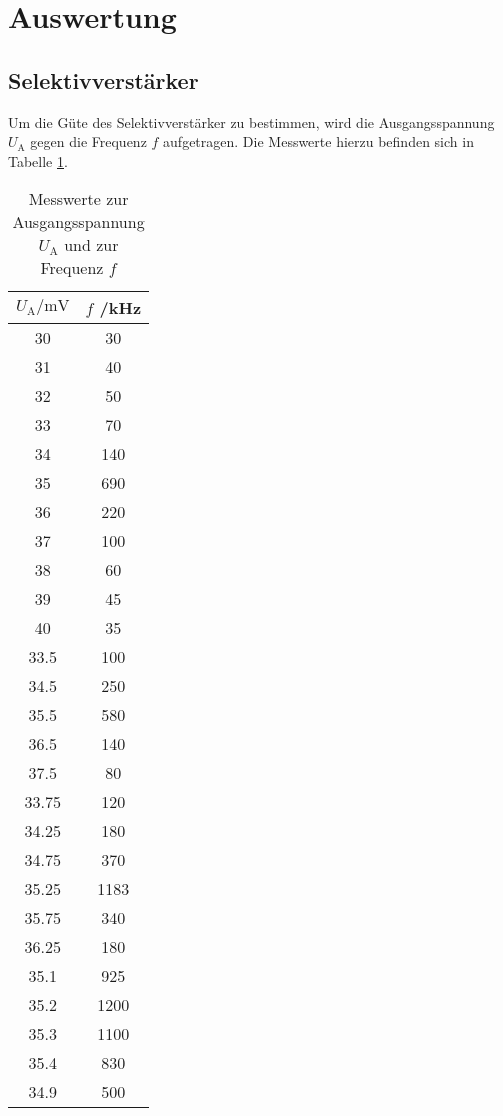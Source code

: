 \section{Auswertung}
\label{sec:Auswertung}

\subsection{Selektivverstärker}
Um die Güte des Selektivverstärker zu bestimmen, wird die Ausgangsspannung $U_\mathrm{A}$ gegen die Frequenz $f$ aufgetragen. Die Messwerte hierzu befinden sich in Tabelle \ref{tab:verstaerker}.

\begin{table}
  \caption{Messwerte zur Ausgangsspannung $U_\mathrm{A}$ und zur Frequenz $f$}
  \centering
  \label{tab:verstaerker}
  \begin{tabular}{c c }
    \toprule
   $U_\mathrm{A}/\si{\milli\volt}$&  $f$ /\si{\kilo\Hz}\\
    \midrule
    30 & 30 \\
    31 & 40\\
    32 & 50\\
    33 & 70\\
    34 & 140\\
    35 & 690\\
    36 & 220\\
    37 & 100\\
    38 & 60\\
    39 & 45\\
    40 & 35\\
    33.5 & 100\\
    34.5 & 250\\
    35.5 & 580\\
    36.5 & 140\\
    37.5 & 80\\
    33.75  &120\\
    34.25 & 180\\
    34.75 & 370\\
    35.25 & 1183\\
    35.75 & 340\\
    36.25 & 180\\
    35.1 & 925\\
    35.2 & 1200\\
    35.3 & 1100\\
    35.4 & 830\\
    34.9 & 500\\
    \bottomrule
    \end{tabular}
\end{table}

